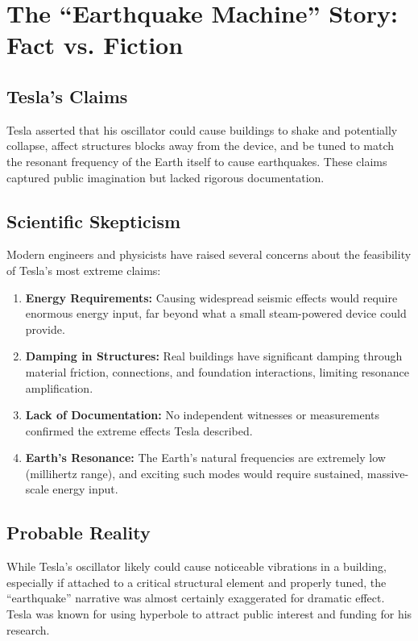 \documentclass[12pt,a4paper]{article}
\begin{document}
\section*{The ``Earthquake Machine'' Story: Fact vs. Fiction}

\subsection*{Tesla's Claims}
Tesla asserted that his oscillator could cause buildings to shake and potentially collapse, affect structures blocks away from the device, and be tuned to match the resonant frequency of the Earth itself to cause earthquakes. These claims captured public imagination but lacked rigorous documentation.

\subsection*{Scientific Skepticism}
Modern engineers and physicists have raised several concerns about the feasibility of Tesla's most extreme claims:

\begin{enumerate}
\item \textbf{Energy Requirements:} Causing widespread seismic effects would require enormous energy input, far beyond what a small steam-powered device could provide.
\item \textbf{Damping in Structures:} Real buildings have significant damping through material friction, connections, and foundation interactions, limiting resonance amplification.
\item \textbf{Lack of Documentation:} No independent witnesses or measurements confirmed the extreme effects Tesla described.
\item \textbf{Earth's Resonance:} The Earth's natural frequencies are extremely low (millihertz range), and exciting such modes would require sustained, massive-scale energy input.
\end{enumerate}

\subsection*{Probable Reality}
While Tesla's oscillator likely could cause noticeable vibrations in a building, especially if attached to a critical structural element and properly tuned, the ``earthquake'' narrative was almost certainly exaggerated for dramatic effect. Tesla was known for using hyperbole to attract public interest and funding for his research.
\end{document}
